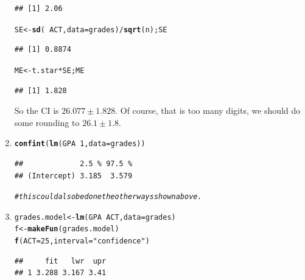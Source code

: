 \documentclass[twoside]{book}\usepackage[]{graphicx}\usepackage[]{xcolor}
\makeatletter
\newcommand{\hlnum}[1]{\textcolor[rgb]{0.686,0.059,0.569}{#1}}%
\newcommand{\hlstr}[1]{\textcolor[rgb]{0.192,0.494,0.8}{#1}}%
\newcommand{\hlcom}[1]{\textcolor[rgb]{0.678,0.584,0.686}{\textit{#1}}}%
\newcommand{\hlopt}[1]{\textcolor[rgb]{0,0,0}{#1}}%
\newcommand{\hlstd}[1]{\textcolor[rgb]{0.345,0.345,0.345}{#1}}%
\newcommand{\hlkwb}[1]{\textcolor[rgb]{0.69,0.353,0.396}{#1}}%
\newcommand{\hlkwc}[1]{\textcolor[rgb]{0.333,0.667,0.333}{#1}}%
\newcommand{\hlkwd}[1]{\textcolor[rgb]{0.737,0.353,0.396}{\textbf{#1}}}%
\newenvironment{kframe}{%
 \def\at@end@of@kframe{}%
 \ifinner\ifhmode%
  \def\at@end@of@kframe{\end{minipage}}%
  \begin{minipage}{\columnwidth}%
 \fi\fi%
 \def\FrameCommand##1{\hskip\@totalleftmargin \hskip-\fboxsep
 \colorbox{shadecolor}{##1}\hskip-\fboxsep
     \hskip-\linewidth \hskip-\@totalleftmargin \hskip\columnwidth}%
 \MakeFramed {\advance\hsize-\width
   \@totalleftmargin\z@ \linewidth\hsize
   \@setminipage}}%
 {\par\unskip\endMakeFramed%
 \at@end@of@kframe}
\newenvironment{knitrout}{}{} %
\makeatother
\begin{document}
\begin{solution}
\begin{enumerate}
\begin{knitrout}
\begin{kframe}
\begin{alltt}
\end{alltt}
\begin{verbatim}
## [1] 2.06
\end{verbatim}
\begin{alltt}
\hlstd{SE} \hlkwb{<-} \hlkwd{sd}\hlstd{(} \hlopt{~} \hlstd{ACT,} \hlkwc{data} \hlstd{= grades)} \hlopt{/} \hlkwd{sqrt}\hlstd{(n); SE}
\end{alltt}
\begin{verbatim}
## [1] 0.8874
\end{verbatim}
\begin{alltt}
\hlstd{ME} \hlkwb{<-} \hlstd{t.star} \hlopt{*} \hlstd{SE; ME}
\end{alltt}
\begin{verbatim}
## [1] 1.828
\end{verbatim}
\end{kframe}
\end{knitrout}
			So the CI is $26.077 \pm 1.828$.  Of course, that is too many digits, we 
			should do some rounding to
			$26.1 \pm 1.8$.  
		\item
\begin{knitrout}
\color{fgcolor}\begin{kframe}
\begin{alltt}
\hlkwd{confint}\hlstd{(}\hlkwd{lm}\hlstd{(GPA} \hlopt{~} \hlnum{1}\hlstd{,} \hlkwc{data} \hlstd{= grades))}
\end{alltt}
\begin{verbatim}
##             2.5 % 97.5 %
## (Intercept) 3.185  3.579
\end{verbatim}
\begin{alltt}
\hlcom{# this could also be done the other ways shown above.}
\end{alltt}
\end{kframe}
\end{knitrout}
		\item
\begin{knitrout}
\color{fgcolor}\begin{kframe}
\begin{alltt}
\hlstd{grades.model} \hlkwb{<-} \hlkwd{lm}\hlstd{(GPA} \hlopt{~} \hlstd{ACT,} \hlkwc{data} \hlstd{= grades)}
\hlstd{f} \hlkwb{<-} \hlkwd{makeFun}\hlstd{(grades.model)}
\hlkwd{f}\hlstd{(}\hlkwc{ACT} \hlstd{=} \hlnum{25}\hlstd{,} \hlkwc{interval} \hlstd{=} \hlstr{"confidence"}\hlstd{)}
\end{alltt}
\begin{verbatim}
##     fit   lwr  upr
## 1 3.288 3.167 3.41
\end{verbatim}
\end{kframe}
\end{knitrout}
		

\end{enumerate}
\end{solution}
\end{document}
